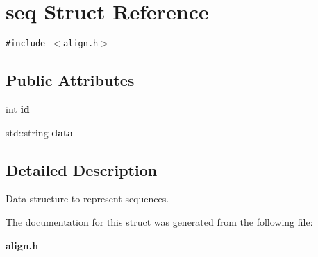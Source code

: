 \section{seq Struct Reference}
\label{structseq}
{\tt \#include $<$align.h$>$}

\subsection*{Public Attributes}
\begin{CompactItemize}
\item 
int {\bf id}\label{structseq_o0}

\item 
std::string {\bf data}\label{structseq_o1}

\end{CompactItemize}


\subsection{Detailed Description}
Data structure to represent sequences. 



The documentation for this struct was generated from the following file:\begin{CompactItemize}
\item 
{\bf align.h}\end{CompactItemize}
